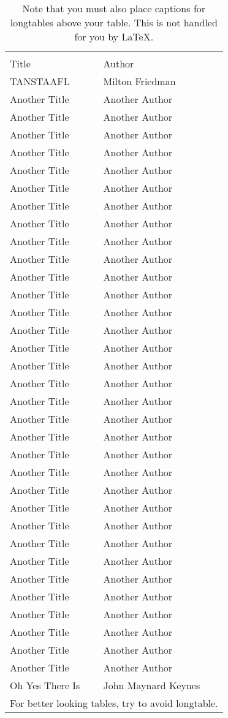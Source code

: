 \documentclass[10pt,econ,letterpaper]{authesis}
\begin{document}
\begin{center}
\begin{longtable}{ll}\hline\hline
\caption{Note that you must also place captions for longtables above your table.
This is not handled for you by LaTeX.}
\\
Title & Author \\ \hline
TANSTAAFL & Milton Friedman \\
Another Title & Another Author \\
Another Title & Another Author \\
Another Title & Another Author \\
Another Title & Another Author \\
Another Title & Another Author \\
Another Title & Another Author \\
Another Title & Another Author \\
Another Title & Another Author \\
Another Title & Another Author \\
Another Title & Another Author \\
Another Title & Another Author \\
Another Title & Another Author \\
Another Title & Another Author \\
Another Title & Another Author \\
Another Title & Another Author \\
Another Title & Another Author \\
Another Title & Another Author \\
Another Title & Another Author \\
Another Title & Another Author \\
Another Title & Another Author \\
Another Title & Another Author \\
Another Title & Another Author \\
Another Title & Another Author \\
Another Title & Another Author \\
Another Title & Another Author \\
Another Title & Another Author \\
Another Title & Another Author \\
Another Title & Another Author \\
Another Title & Another Author \\
Another Title & Another Author \\
Another Title & Another Author \\
Another Title & Another Author \\
Another Title & Another Author \\
Oh Yes There Is & John Maynard Keynes \\ \hline
\multicolumn{2}{c}{\small For better looking tables, try to avoid longtable.}
\end{longtable}
\end{center}
\end{document}
